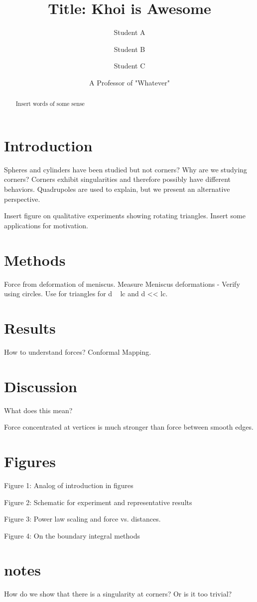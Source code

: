 \documentclass[twocolumn,prl]{revtex4-1}
\begin{document}
\title{Title: Khoi is Awesome}
\author{Student A}
\author{Student B}
\author{Student C}
\author{A Professor of "Whatever"}

\begin{abstract}
Insert words of some sense
\end{abstract}

\maketitle

\section{Introduction}
Spheres and cylinders have been studied but not corners? Why are we studying corners? Corners exhibit singularities and therefore possibly have different behaviors. Quadrupoles are used to explain, but we present an alternative perspective.

Insert figure on qualitative experiments showing rotating triangles.
Insert some applications for motivation.

\section{Methods}
Force from deformation of meniscus. Measure Meniscus deformations - Verify using circles. Use for triangles for d ~ lc and d << lc.

\section{Results}
How to understand forces? Conformal Mapping.

\section{Discussion}
What does this mean?

Force concentrated at vertices is much stronger than force between smooth edges.

\section{Figures}
Figure 1: Analog of introduction in figures

Figure 2: Schematic for experiment and representative results 

Figure 3: Power law scaling and force vs. distances.

Figure 4: On the boundary integral methods

\section{notes}
How do we show that there is a singularity at corners? Or is it too trivial?
\end{document}
